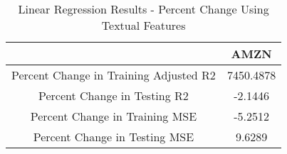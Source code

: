 \begin{table}[!h]
\caption{Linear Regression Results - Percent Change Using Textual Features}
 \label{Linear Regression Results - Percent Change Using Textual Features}
\captionsetup{justification=centering} 
 \begin{center}\begin{tabular}{|c|c|}\hline
{} &       AMZN \\ \hline
Percent Change in Training Adjusted R2 &  7450.4878 \\ \hline
Percent Change in Testing R2           &    -2.1446 \\ \hline
Percent Change in Training MSE         &    -5.2512 \\ \hline
Percent Change in Testing MSE          &     9.6289 \\ \hline
\end{tabular}
 \end{center}
\end{table}